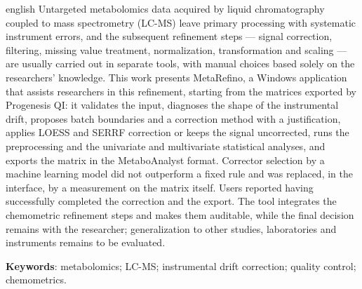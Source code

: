\begin{resumo}[Abstract]
 \begin{otherlanguage*}{english}
   Untargeted metabolomics data acquired by liquid chromatography coupled to mass spectrometry (LC-MS) leave primary processing with systematic instrument errors, and the subsequent refinement steps --- signal correction, filtering, missing value treatment, normalization, transformation and scaling --- are usually carried out in separate tools, with manual choices based solely on the researchers' knowledge. This work presents MetaRefino, a Windows application that assists researchers in this refinement, starting from the matrices exported by Progenesis QI: it validates the input, diagnoses the shape of the instrumental drift, proposes batch boundaries and a correction method with a justification, applies LOESS and SERRF correction or keeps the signal uncorrected, runs the preprocessing and the univariate and multivariate statistical analyses, and exports the matrix in the MetaboAnalyst format. Corrector selection by a machine learning model did not outperform a fixed rule and was replaced, in the interface, by a measurement on the matrix itself. Users reported having successfully completed the correction and the export. The tool integrates the chemometric refinement steps and makes them auditable, while the final decision remains with the researcher; generalization to other studies, laboratories and instruments remains to be evaluated.

   \vspace{\onelineskip}

   \noindent
   \textbf{Keywords}: metabolomics; LC-MS; instrumental drift correction; quality control; chemometrics.
 \end{otherlanguage*}
\end{resumo}